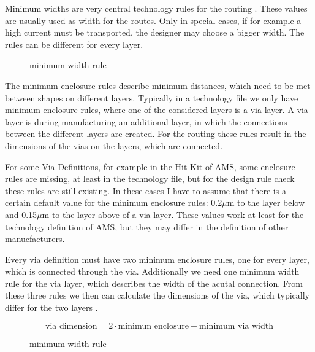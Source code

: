 Minimum widths are very central technology rules for the routing . These values are usually used as width for the routes. Only in special cases, if for example a high current must be transported, the designer may choose a bigger width. The rules can be different for every layer.

\begin{figure}
	\centering
	
	\caption{minimum width rule}
	\label{fig:technology_rule_width}
\end{figure}

The minimum enclosure rules describe minimum distances, which need to be met between shapes on different layers. Typically in a technology file we only have minimum enclosure rules, where one of the considered layers is a via layer. A via layer is during manufacturing an additional layer, in which the connections between the different layers are created. For the routing these rules result in the dimensions of the vias on the layers, which are connected.

For some Via-Definitions, for example in the Hit-Kit of AMS, some enclosure rules are missing, at least in the technology file, but for the design rule check these rules are still existing. In these cases I have to assume that there is a certain default value for the minimum enclosure rules: 0.2$\mu$m to the layer below and 0.15$\mu$m to the layer above of a via layer. These values work at least for the technology definition of AMS, but they may differ in the definition of other manucfacturers.

Every via definition must have two minimum enclosure rules, one for every layer, which is connected through the via. Additionally we need one minimum width rule for the via layer, which describes the width of the acutal connection. From these three rules we then can calculate the dimensions of the via, which typically differ for the two layers .

\[\text{via dimension} = 2 \cdot \text{minimun enclosure} + \text{minimum via width}\]

\begin{figure}
	\centering
	
	\caption{minimum width rule}
	\label{fig:technology_rule_via_dimensions}
\end{figure}